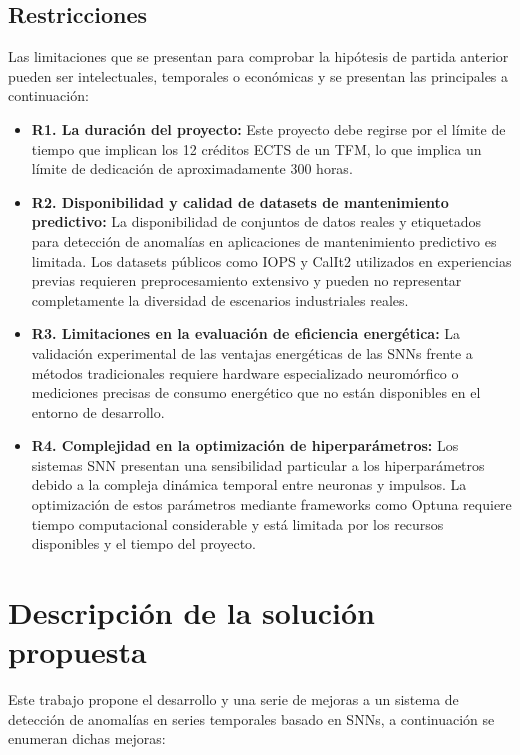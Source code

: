 \subsection{Restricciones}
Las limitaciones que se presentan para comprobar la hipótesis de partida anterior pueden ser intelectuales, temporales o económicas y se presentan las principales a continuación:
\begin{itemize}
    \item \textbf{R1. La duración del proyecto:} Este proyecto debe regirse por el límite de tiempo que implican los 12 créditos ECTS de un TFM, lo que implica un límite de dedicación de aproximadamente 300 horas.
    \item \textbf{R2. Disponibilidad y calidad de datasets de mantenimiento predictivo:} La disponibilidad de conjuntos de datos reales y etiquetados para detección de anomalías en aplicaciones de mantenimiento predictivo es limitada. Los datasets públicos como IOPS y CalIt2 utilizados en experiencias previas requieren preprocesamiento extensivo y pueden no representar completamente la diversidad de escenarios industriales reales.
    \item \textbf{R3. Limitaciones en la evaluación de eficiencia energética:} La validación experimental de las ventajas energéticas de las SNNs frente a métodos tradicionales requiere hardware especializado neuromórfico o mediciones precisas de consumo energético que no están disponibles en el entorno de desarrollo.
    \item \textbf{R4. Complejidad en la optimización de hiperparámetros:} Los sistemas SNN presentan una sensibilidad particular a los hiperparámetros debido a la compleja dinámica temporal entre neuronas y impulsos. La optimización de estos parámetros mediante frameworks como Optuna requiere tiempo computacional considerable y está limitada por los recursos disponibles y el tiempo del proyecto.
\end{itemize}

\section{Descripción de la solución propuesta}

Este trabajo propone el desarrollo y una serie de mejoras a un sistema de detección de anomalías en series temporales basado en SNNs, a continuación se enumeran dichas mejoras:

